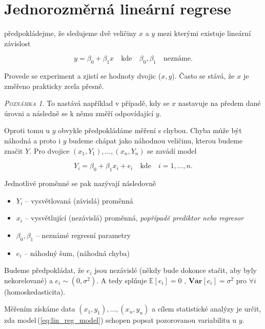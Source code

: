 \documentclass[oneside,intlimits,reqno]{scrbook}
\theoremstyle{definition}
\theoremstyle{plain}
\theoremstyle{remark}
\newtheorem{remark}[define]{\textsc{Poznámka}}
\begin{document}
\section{Jednorozměrná lineární regrese}

předpokládejme, že sledujeme dvě veličiny $ x $ a $ y $ mezi kterými existuje lineární závislost

\begin{equation}
	y = \beta_{0} + \beta_{1} x   \quad \text{kde} \quad \beta_{0}, \beta_{1} \quad \text{neznáme.} 
\end{equation}

Provede se experiment a zjistí se hodnoty dvojic ($ x , y $). Často se stává, že $ x $ je změřeno prakticky zcela přesně.

\begin{remark}
 To nastává například v případě, kdy se $ x $ nastavuje na předem dané úrovni a následně se k němu změří odpovídající $ y $.
\end{remark}
 
Oproti tomu u $ y $ obvykle předpokládáme měření s chybou. Chyba může být náhodná a proto i $ y $ budeme chápat jako náhodnou veličinu, kterou budeme značit $ Y $. Pro dvojice $ (x_{1}, Y_{1}), \dots ,( x_{n}, Y_{n} )$ se zavádí model

\begin{equation}\label{eq:lin_reg_model}
	Y_{i} = \beta_{0} + \beta_{1} x_{i} + e_{i} \quad \text{kde} \quad i = 1, \dots ,n .
\end{equation}

Jednotlivé proměnné se pak nazývají následovně

\begin{itemize}
  \item $ Y_{i} $ -- vysvětlovaná (závislá) proměnná
  \item $ x_{i} $ -- vysvětlující (nezávislá) proměnná, \textit{popřípadě prediktor nebo regresor}
  \item $ \beta_{0},\beta_{1} $ -- neznámé regresní parametry
  \item $ e_{i} $ -- náhodný šum, (náhodná chyba)
\end{itemize}

Budeme předpokládat, že $ e_{i} $ jsou nezávislé (někdy bude dokonce stačit, aby byly nekorelované) a $ e_{i} \sim (0,\sigma ^{2}) $. A tedy splňuje $ \mathbb{E} [ e_{i} ]  = 0 $ , $ \textbf{Var} [ e_{i} ] = \sigma ^{2} $ pro $ \forall i $ (homoskedasticita).

Měřením získáme data $ (x_{1}, y_{1}), \dots ,( x_{n}, y_{n} )$ a cílem statistické analýzy je určit, zda model\,(\eqref{eq:lin_reg_model}) schopen popsat pozorovanou variabilitu u $ y $. 
\end{document}
